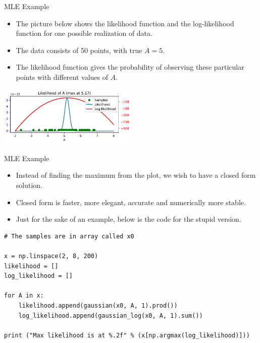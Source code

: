 \documentclass[10pt, aspectratio=169]{beamer} %
\begin{document}
\begin{frame}[allowframebreaks=0.8]
{MLE Example}

\begin{itemize}
\item  The picture below shows the likelihood function and the
  log-likelihood function for one possible realization of data.
\item The data consists of 50 points, with true $A=5$. 
\item The likelihood function gives the
  probability of observing these particular points with different
  values of $A$.
\end{itemize}
\centerline{\includegraphics[width=0.5\textwidth]{PDF_A_LL_full.pdf}}
\end{frame}

\begin{frame}[fragile,allowframebreaks=0.8]
{MLE Example}
\begin{itemize}
\item Instead of finding the maximum from the plot, 
we wish to have a closed form solution.
\item Closed form is faster, more elegant, accurate and numerically more stable.
\item Just for the sake of an example, below is the code for the stupid version.
\end{itemize}
\begin{center}
\begin{minipage}{9cm}
\begin{lstlisting}
# The samples are in array called x0

x = np.linspace(2, 8, 200)
likelihood = []
log_likelihood = []

for A in x:
    likelihood.append(gaussian(x0, A, 1).prod())
    log_likelihood.append(gaussian_log(x0, A, 1).sum())

print ("Max likelihood is at %.2f" % (x[np.argmax(log_likelihood)]))
\end{lstlisting}
\end{minipage}
\end{center}
\end{frame}
\end{document}
